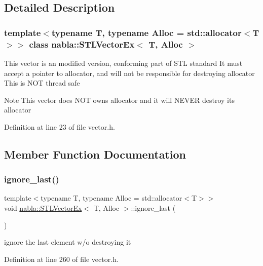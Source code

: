 \subsection{Detailed Description}
\subsubsection*{template$<$typename T, typename Alloc = std\+::allocator$<$\+T$>$$>$\newline
class nabla\+::\+S\+T\+L\+Vector\+Ex$<$ T, Alloc $>$}

This vector is an modified version, conforming part of S\+TL standard It must accept a pointer to allocator, and will not be responsible for destroying allocator This is N\+OT thread safe \begin{DoxyNote}{Note}
This vector does N\+OT owns allocator and it will N\+E\+V\+ER destroy it\textquotesingle{}s allocator 
\end{DoxyNote}


Definition at line 23 of file vector.\+h.



\subsection{Member Function Documentation}
\mbox{\label{classnabla_1_1_s_t_l_vector_ex_a8be72171d8b6128e38d0810b27b622d8}} 
\subsubsection{\texorpdfstring{ignore\_last()}{ignore\_last()}}
{\footnotesize\ttfamily template$<$typename T, typename Alloc = std\+::allocator$<$\+T$>$$>$ \\
void \mbox{\hyperlink{classnabla_1_1_s_t_l_vector_ex}{nabla\+::\+S\+T\+L\+Vector\+Ex}}$<$ T, Alloc $>$\+::ignore\+\_\+last (\begin{DoxyParamCaption}{ }\end{DoxyParamCaption})\hspace{0.3cm}{\ttfamily [inline]}}

ignore the last element w/o destroying it 

Definition at line 260 of file vector.\+h.

